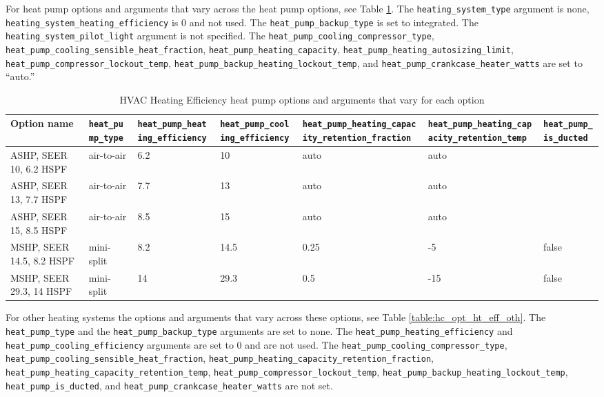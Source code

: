 For heat pump options and arguments that vary across the heat pump options, see Table \ref{table:hc_opt_ht_eff_hp}. The \texttt{heating\_system\_type} argument is none, \texttt{heating\_system\_heating\_efficiency} is 0 and not used. The \texttt{heat\_pump\_backup\_type} is set to integrated. The \texttt{heating\_system\_pilot\_light} argument is not specified. The \texttt{heat\_pump\_cooling\_compressor\_type}, 
\texttt{heat\_pump\_cooling\_sensible\_heat\_fraction}, 
\texttt{heat\_pump\_heating\_capacity}, \texttt{heat\_pump\_heating\_autosizing\_limit}, \texttt{heat\_pump\_compressor\_lockout\_temp}, \texttt{heat\_pump\_backup\_heating\_lockout\_temp}, and \texttt{heat\_pump\_crankcase\_heater\_watts} are set to ``auto.''

\begin{longtable}[]{ |p{2.2cm}|p{1.5cm}|p{2.1cm}|p{2.1cm}|p{2.2cm}|p{2.2cm}|p{1.4cm}| }
\caption{HVAC Heating Efficiency heat pump options and arguments that vary for each option} \label{table:hc_opt_ht_eff_hp} \\
\toprule\noalign{}
Option name &
\texttt{heat\_pump\_type} &
\texttt{heat\_pump\_heating\_efficiency} &
\texttt{heat\_pump\_cooling\_efficiency} &
\texttt{heat\_pump\_heating\_capacity\_retention\_fraction} & \texttt{heat\_pump\_heating\_capacity\_retention\_temp} &
\texttt{heat\_pump\_is\_ducted} \\
\midrule\noalign{}
\endhead
\bottomrule\noalign{}
\endlastfoot
ASHP, SEER 10, 6.2 HSPF &
air-to-air & 6.2 & 10 & auto &
auto & \\ \hline
ASHP, SEER 13, 7.7 HSPF &
air-to-air & 7.7 & 13 & auto &
auto & \\\hline
ASHP, SEER 15, 8.5 HSPF &
air-to-air & 8.5 & 15 & auto &
auto & \\\hline
MSHP, SEER 14.5, 8.2 HSPF &
mini-split & 8.2 & 14.5 & 0.25
& -5 & false \\\hline
MSHP, SEER 29.3, 14 HSPF &
mini-split & 14 & 29.3 & 0.5 &
-15  & false \\
\end{longtable}

For other heating systems the options and arguments that vary across these options, see Table \ref{table:hc_opt_ht_eff_oth}. The \texttt{heat\_pump\_type} and the \texttt{heat\_pump\_backup\_type} arguments are set to none. The \texttt{heat\_pump\_heating\_efficiency} and \texttt{heat\_pump\_cooling\_efficiency} arguments are set to 0 and are not used. The \texttt{heat\_pump\_cooling\_compressor\_type}, \texttt{heat\_pump\_cooling\_sensible\_heat\_fraction}, \texttt{heat\_pump\_heating\_capacity\_retention\_fraction},  \texttt{heat\_pump\_heating\_capacity\_retention\_temp}, \texttt{heat\_pump\_compressor\_lockout\_temp}, \texttt{heat\_pump\_backup\_heating\_lockout\_temp}, \texttt{heat\_pump\_is\_ducted}, and \texttt{heat\_pump\_crankcase\_heater\_watts} are not set.

